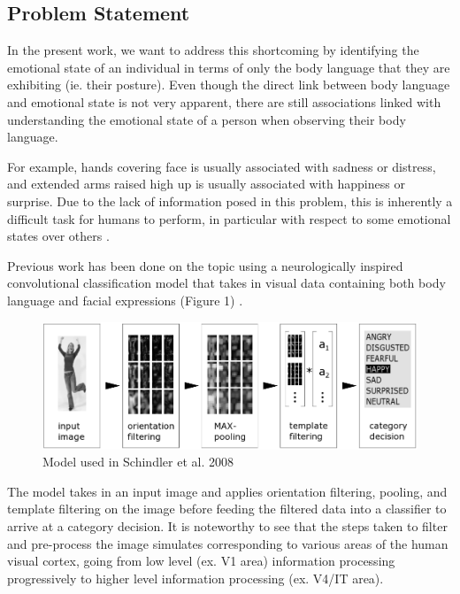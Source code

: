 \documentclass{article}
\begin{document}
\subsection{Problem Statement}

In the present work, we want to address this shortcoming by identifying the emotional state of an individual in terms of only the body language that they are exhibiting (ie. their posture). Even though the direct link between body language and emotional state is not very apparent, there are still associations linked with understanding the emotional state of a person when observing their body language. 

For example, hands covering face is usually associated with sadness or distress, and extended arms raised high up is usually associated with happiness or surprise. Due to the lack of information posed in this problem, this is inherently a difficult task for humans to perform, in particular with respect to some emotional states over others \citep{schindler2008recognizing} \citep{de2011bodily}. 

Previous work has been done on the topic using a neurologically inspired convolutional classification model that takes in visual data containing both body language and facial expressions (Figure 1) \citep{schindler2008recognizing}.

\begin{figure}[h]
	\centering
	\includegraphics[scale=0.4]{schindlernet}
	\caption{Model used in Schindler et al. 2008}
\end{figure}

The model takes in an input image and applies orientation filtering, pooling, and template filtering on the image before feeding the filtered data into a classifier to arrive at a category decision. It is noteworthy to see that the steps taken to filter and pre-process the image simulates corresponding to various areas of the human visual cortex, going from low level (ex. V1 area) information processing progressively to higher level information processing (ex. V4/IT area).
\end{document}

